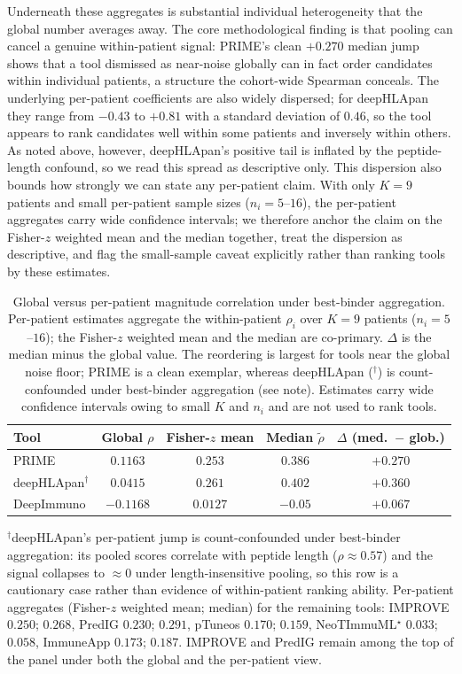 Underneath these aggregates is substantial individual heterogeneity that the
global number averages away. The core methodological finding is that pooling can
cancel a genuine within-patient signal: PRIME's clean $+0.270$ median jump shows
that a tool dismissed as near-noise globally can in fact order candidates within
individual patients, a structure the cohort-wide Spearman conceals. The underlying
per-patient coefficients are also widely dispersed; for deepHLApan they range from
$-0.43$ to $+0.81$ with a standard deviation of $0.46$, so the tool appears to rank
candidates well within some patients and inversely within others. As noted above,
however, deepHLApan's positive tail is inflated by the peptide-length confound, so
we read this spread as descriptive only. This dispersion also bounds how strongly
we can state any per-patient claim. With only $K = 9$ patients and small
per-patient sample sizes ($n_i = 5$--$16$), the per-patient aggregates carry wide
confidence intervals; we therefore anchor the claim on the Fisher-$z$ weighted mean
and the median together, treat the dispersion as descriptive, and flag the
small-sample caveat explicitly rather than ranking tools by these estimates.

\begin{table}[t]
\centering
\caption{Global versus per-patient magnitude correlation under best-binder
aggregation. Per-patient estimates aggregate the within-patient $\rho_i$ over
$K = 9$ patients ($n_i = 5$--$16$); the Fisher-$z$ weighted mean and the median
are co-primary. $\Delta$ is the median minus the global value. The reordering is
largest for tools near the global noise floor; PRIME is a clean exemplar, whereas
deepHLApan ($^{\dagger}$) is count-confounded under best-binder aggregation (see
note). Estimates carry wide confidence intervals owing to small $K$ and $n_i$ and
are not used to rank tools.}
\label{tab:perpatient}
\begin{tabular}{lcccc}
\toprule
Tool & Global $\rho$ & Fisher-$z$ mean & Median $\tilde{\rho}$ & $\Delta$ (med.\ $-$ glob.) \\
\midrule
PRIME                  & $0.1163$  & $0.253$  & $0.386$  & $+0.270$ \\
deepHLApan$^{\dagger}$ & $0.0415$  & $0.261$  & $0.402$  & $+0.360$ \\
DeepImmuno             & $-0.1168$ & $0.0127$ & $-0.05$  & $+0.067$ \\
\bottomrule
\end{tabular}

\vspace{2pt}
{\footnotesize $^{\dagger}$deepHLApan's per-patient jump is count-confounded under
best-binder aggregation: its pooled scores correlate with peptide length
($\rho \approx 0.57$) and the signal collapses to $\approx 0$ under
length-insensitive pooling, so this row is a cautionary case rather than evidence
of within-patient ranking ability. Per-patient aggregates (Fisher-$z$ weighted
mean; median) for the remaining tools: IMPROVE $0.250$; $0.268$, PredIG $0.230$;
$0.291$, pTuneos $0.170$; $0.159$, NeoTImmuML$^\star$ $0.033$; $0.058$, ImmuneApp
$0.173$; $0.187$. IMPROVE and PredIG remain among the top of the panel under both
the global and the per-patient view.}
\end{table}

